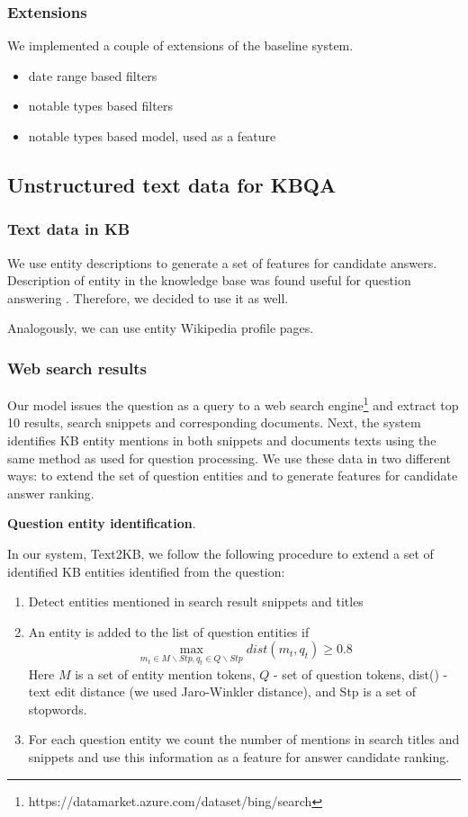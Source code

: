 \subsubsection{Extensions}
We implemented a couple of extensions of the baseline system.

\begin{itemize}
\item date range based filters
\item notable types based filters
\item notable types based model, used as a feature
\end{itemize}

\subsection{Unstructured text data for KBQA}

\subsubsection{Text data in KB}
We use entity descriptions to generate a set of features for candidate answers.
Description of entity in the knowledge base was found useful for question answering \cite{Sun:2015:ODQ:2736277.2741651}.
Therefore, we decided to use it as well.

Analogously, we can use entity Wikipedia profile pages.

\subsubsection{Web search results}
\label{section:method:web}

Our model issues the question as a query to a web search engine\footnote{https://datamarket.azure.com/dataset/bing/search} and extract top 10 results, \ie search snippets and corresponding documents.
Next, the system identifies KB entity mentions in both snippets and documents texts using the same method as used for question processing.
We use these data in two different ways: to extend the set of question entities and to generate features for candidate answer ranking.

\textbf{Question entity identification}.

In our system, Text2KB, we follow the following procedure to extend a set of identified KB entities identified from the question:
\begin{enumerate}
\item Detect entities mentioned in search result snippets and titles
\item An entity is added to the list of question entities if 
$$\max_{m_t \in M\backslash Stp, q_t \in Q\backslash Stp} dist(m_t, q_t) \geq 0.8$$
Here $M$ is a set of entity mention tokens, $Q$ - set of question tokens, dist() - text edit distance (we used Jaro-Winkler distance), and Stp is a set of stopwords.
\item For each question entity we count the number of mentions in search titles and snippets and use this information as a feature for answer candidate ranking.
\end{enumerate}


